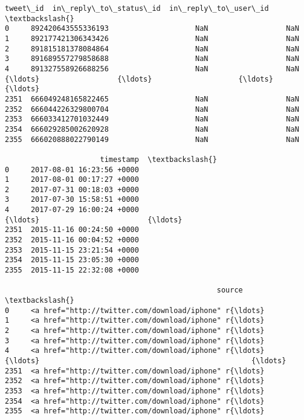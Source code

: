 \documentclass[11pt]{article}
\makeatletter
\newcommand{\boxspacing}{\kern\kvtcb@left@rule\kern\kvtcb@boxsep}
\newcommand{\prompt}[4]{
        \ttfamily\llap{{\color{#2}[#3]:\hspace{3pt}#4}}\vspace{-\baselineskip}
    }
\makeatother
\begin{document}
            \begin{tcolorbox}[breakable, size=fbox, boxrule=.5pt, pad at break*=1mm, opacityfill=0]
\prompt{Out}{outcolor}{100}{\boxspacing}
\begin{Verbatim}[commandchars=\\\{\}]
                tweet\_id  in\_reply\_to\_status\_id  in\_reply\_to\_user\_id  \textbackslash{}
0     892420643555336193                    NaN                  NaN
1     892177421306343426                    NaN                  NaN
2     891815181378084864                    NaN                  NaN
3     891689557279858688                    NaN                  NaN
4     891327558926688256                    NaN                  NaN
{\ldots}                  {\ldots}                    {\ldots}                  {\ldots}
2351  666049248165822465                    NaN                  NaN
2352  666044226329800704                    NaN                  NaN
2353  666033412701032449                    NaN                  NaN
2354  666029285002620928                    NaN                  NaN
2355  666020888022790149                    NaN                  NaN

                      timestamp  \textbackslash{}
0     2017-08-01 16:23:56 +0000
1     2017-08-01 00:17:27 +0000
2     2017-07-31 00:18:03 +0000
3     2017-07-30 15:58:51 +0000
4     2017-07-29 16:00:24 +0000
{\ldots}                         {\ldots}
2351  2015-11-16 00:24:50 +0000
2352  2015-11-16 00:04:52 +0000
2353  2015-11-15 23:21:54 +0000
2354  2015-11-15 23:05:30 +0000
2355  2015-11-15 22:32:08 +0000

                                                 source  \textbackslash{}
0     <a href="http://twitter.com/download/iphone" r{\ldots}
1     <a href="http://twitter.com/download/iphone" r{\ldots}
2     <a href="http://twitter.com/download/iphone" r{\ldots}
3     <a href="http://twitter.com/download/iphone" r{\ldots}
4     <a href="http://twitter.com/download/iphone" r{\ldots}
{\ldots}                                                 {\ldots}
2351  <a href="http://twitter.com/download/iphone" r{\ldots}
2352  <a href="http://twitter.com/download/iphone" r{\ldots}
2353  <a href="http://twitter.com/download/iphone" r{\ldots}
2354  <a href="http://twitter.com/download/iphone" r{\ldots}
2355  <a href="http://twitter.com/download/iphone" r{\ldots}


\end{Verbatim}
\end{tcolorbox}
\end{document}
